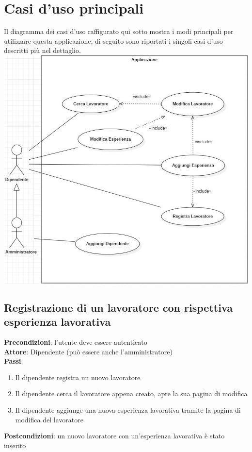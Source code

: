 \documentclass[ 4paper,11pt,openany]{book}
\begin{document}
\section{Casi d'uso principali}
Il diagramma dei casi d'uso raffigurato qui sotto mostra i modi principali per utilizzare questa applicazione, di seguito sono riportati i singoli casi d'uso descritti più nel dettaglio.\\
\advance\leftskip-0.5cm
\includegraphics[width=180mm]{casi.jpg}

\subsection{Registrazione di un lavoratore con rispettiva esperienza lavorativa}
\textbf{Precondizioni}: l'utente deve essere autenticato\\
\textbf{Attore}: Dipendente (può essere anche l'amministratore)\\
\textbf{Passi}:
\begin{enumerate}
\item Il dipendente registra un nuovo lavoratore
\item Il dipendente cerca il lavoratore appena creato, apre la sua pagina di modifica 
\item Il dipendente aggiunge una nuova esperienza lavorativa tramite la pagina di modifica del lavoratore
\end{enumerate}
\textbf{Postcondizioni}: un nuovo lavoratore con un'esperienza lavorativa è stato inserito\\
\end{document}
